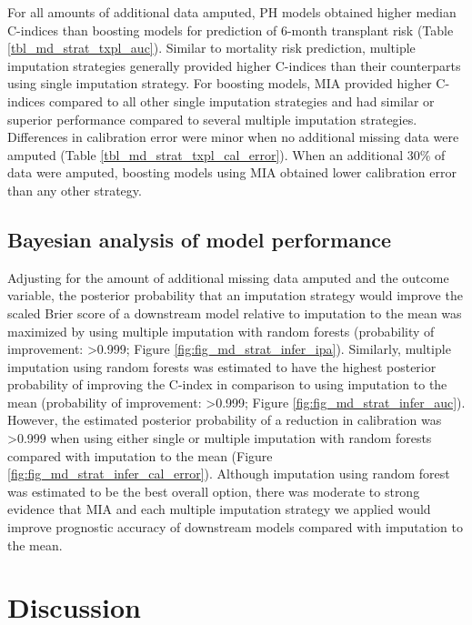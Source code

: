 \documentclass{article}
\begin{document}
For all amounts of additional data amputed, PH models obtained higher
median C-indices than boosting models for prediction of 6-month
transplant risk (Table \ref{tbl_md_strat_txpl_auc}). Similar to
mortality risk prediction, multiple imputation strategies generally
provided higher C-indices than their counterparts using single
imputation strategy. For boosting models, MIA provided higher C-indices
compared to all other single imputation strategies and had similar or
superior performance compared to several multiple imputation strategies.
Differences in calibration error were minor when no additional missing
data were amputed (Table \ref{tbl_md_strat_txpl_cal_error}). When an
additional 30\% of data were amputed, boosting models using MIA obtained
lower calibration error than any other strategy.

\hypertarget{bayesian-analysis-of-model-performance}{%
\subsection{Bayesian analysis of model
performance}\label{bayesian-analysis-of-model-performance}}

Adjusting for the amount of additional missing data amputed and the
outcome variable, the posterior probability that an imputation strategy
would improve the scaled Brier score of a downstream model relative to
imputation to the mean was maximized by using multiple imputation with
random forests (probability of improvement: \textgreater0.999; Figure
\ref{fig:fig_md_strat_infer_ipa}). Similarly, multiple imputation using
random forests was estimated to have the highest posterior probability
of improving the C-index in comparison to using imputation to the mean
(probability of improvement: \textgreater0.999; Figure
\ref{fig:fig_md_strat_infer_auc}). However, the estimated posterior
probability of a reduction in calibration was \textgreater0.999 when
using either single or multiple imputation with random forests compared
with imputation to the mean (Figure
\ref{fig:fig_md_strat_infer_cal_error}). Although imputation using
random forest was estimated to be the best overall option, there was
moderate to strong evidence that MIA and each multiple imputation
strategy we applied would improve prognostic accuracy of downstream
models compared with imputation to the mean.

\hypertarget{discussion}{%
\section{Discussion}\label{discussion}}
\end{document}
